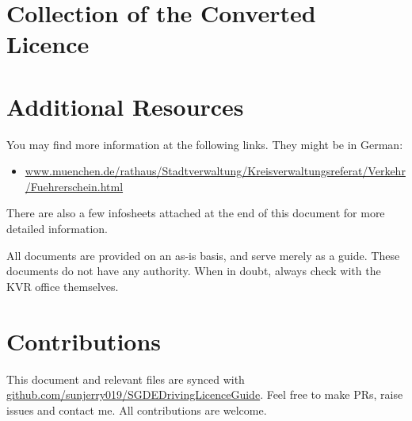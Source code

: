 \documentclass{article}
\begin{document}
\section{Collection of the Converted Licence}
    
\section{Additional Resources}
    You may find more information at the following links. They might be in German:
    \begin{itemize}
        \item \url{www.muenchen.de/rathaus/Stadtverwaltung/Kreisverwaltungsreferat/Verkehr/Fuehrerschein.html}
    \end{itemize}
    
    There are also a few infosheets attached at the end of this document for more detailed information. 
    
    All documents are provided on an as-is basis, and serve merely as a guide. These documents do not have any authority. When in doubt, always check with the KVR office themselves.
    
\section{Contributions}
    This document and relevant files are synced with \href{https://github.com/sunjerry019/SGDEDrivingLicenceGuide}{github.com/sunjerry019/SGDEDrivingLicenceGuide}. Feel free to make PRs, raise issues and contact me. All contributions are welcome.

\pagebreak 



\end{document}
